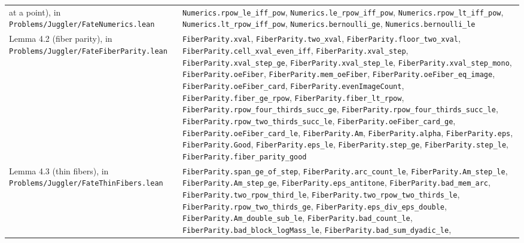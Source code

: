 \documentclass[11pt,a4paper]{article}
\begin{document}
\begin{longtable}[]{@{}
  >{\raggedright\arraybackslash}p{}
  >{\raggedright\arraybackslash}p{}@{}}
at a point), in \texttt{\nolinkurl{Problems/Juggler/FateNumerics.lean}}
& \texttt{\nolinkurl{Numerics.rpow_le_iff_pow}},
\texttt{\nolinkurl{Numerics.le_rpow_iff_pow}},
\texttt{\nolinkurl{Numerics.rpow_lt_iff_pow}},
\texttt{\nolinkurl{Numerics.lt_rpow_iff_pow}},
\texttt{\nolinkurl{Numerics.bernoulli_ge}},
\texttt{\nolinkurl{Numerics.bernoulli_le}} \\
Lemma 4.2 (fiber parity), in
\texttt{\nolinkurl{Problems/Juggler/FateFiberParity.lean}} &
\texttt{\nolinkurl{FiberParity.xval}},
\texttt{\nolinkurl{FiberParity.two_xval}},
\texttt{\nolinkurl{FiberParity.floor_two_xval}},
\texttt{\nolinkurl{FiberParity.cell_xval_even_iff}},
\texttt{\nolinkurl{FiberParity.xval_step}},
\texttt{\nolinkurl{FiberParity.xval_step_ge}},
\texttt{\nolinkurl{FiberParity.xval_step_le}},
\texttt{\nolinkurl{FiberParity.xval_step_mono}},
\texttt{\nolinkurl{FiberParity.oeFiber}},
\texttt{\nolinkurl{FiberParity.mem_oeFiber}},
\texttt{\nolinkurl{FiberParity.oeFiber_eq_image}},
\texttt{\nolinkurl{FiberParity.oeFiber_card}},
\texttt{\nolinkurl{FiberParity.evenImageCount}},
\texttt{\nolinkurl{FiberParity.fiber_ge_rpow}},
\texttt{\nolinkurl{FiberParity.fiber_lt_rpow}},
\texttt{\nolinkurl{FiberParity.rpow_four_thirds_succ_ge}},
\texttt{\nolinkurl{FiberParity.rpow_four_thirds_succ_le}},
\texttt{\nolinkurl{FiberParity.rpow_two_thirds_succ_le}},
\texttt{\nolinkurl{FiberParity.oeFiber_card_ge}},
\texttt{\nolinkurl{FiberParity.oeFiber_card_le}},
\texttt{\nolinkurl{FiberParity.Am}},
\texttt{\nolinkurl{FiberParity.alpha}},
\texttt{\nolinkurl{FiberParity.eps}},
\texttt{\nolinkurl{FiberParity.Good}},
\texttt{\nolinkurl{FiberParity.eps_le}},
\texttt{\nolinkurl{FiberParity.step_ge}},
\texttt{\nolinkurl{FiberParity.step_le}},
\texttt{\nolinkurl{FiberParity.fiber_parity_good}} \\
Lemma 4.3 (thin fibers), in
\texttt{\nolinkurl{Problems/Juggler/FateThinFibers.lean}} &
\texttt{\nolinkurl{FiberParity.span_ge_of_step}},
\texttt{\nolinkurl{FiberParity.arc_count_le}},
\texttt{\nolinkurl{FiberParity.Am_step_le}},
\texttt{\nolinkurl{FiberParity.Am_step_ge}},
\texttt{\nolinkurl{FiberParity.eps_antitone}},
\texttt{\nolinkurl{FiberParity.bad_mem_arc}},
\texttt{\nolinkurl{FiberParity.two_rpow_third_le}},
\texttt{\nolinkurl{FiberParity.two_rpow_two_thirds_le}},
\texttt{\nolinkurl{FiberParity.rpow_two_thirds_ge}},
\texttt{\nolinkurl{FiberParity.eps_div_eps_double}},
\texttt{\nolinkurl{FiberParity.Am_double_sub_le}},
\texttt{\nolinkurl{FiberParity.bad_count_le}},
\texttt{\nolinkurl{FiberParity.bad_block_logMass_le}},
\texttt{\nolinkurl{FiberParity.bad_sum_dyadic_le}},

\end{longtable}
\end{document}
